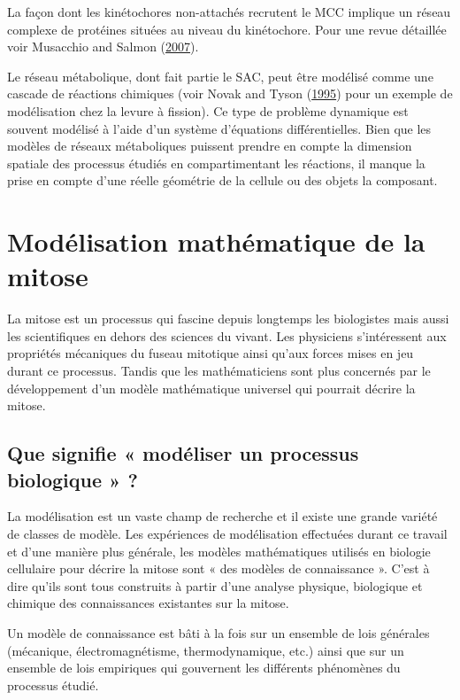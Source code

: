 \documentclass[12pt,a4paper,twoside,openright]{book}
\begin{document}
La façon dont les kinétochores non-attachés recrutent le MCC implique un
réseau complexe de protéines situées au niveau du kinétochore. Pour une
revue détaillée voir Musacchio and Salmon
(\hyperref[ref-Musacchio2007]{2007}).

Le réseau métabolique, dont fait partie le SAC, peut être modélisé comme
une cascade de réactions chimiques (voir Novak and Tyson
(\hyperref[ref-Novak1995]{1995}) pour un exemple de modélisation chez la
levure à fission). Ce type de problème dynamique est souvent modélisé à
l'aide d'un système d'équations différentielles. Bien que les modèles de
réseaux métaboliques puissent prendre en compte la dimension spatiale
des processus étudiés en compartimentant les réactions, il manque la
prise en compte d'une réelle géométrie de la cellule ou des objets la
composant.

\section{Modélisation mathématique de la
mitose}\label{moduxe9lisation-mathuxe9matique-de-la-mitose}

La mitose est un processus qui fascine depuis longtemps les biologistes
mais aussi les scientifiques en dehors des sciences du vivant. Les
physiciens s'intéressent aux propriétés mécaniques du fuseau mitotique
ainsi qu'aux forces mises en jeu durant ce processus. Tandis que les
mathématiciens sont plus concernés par le développement d'un modèle
mathématique universel qui pourrait décrire la mitose.

\subsection{Que signifie « modéliser un processus biologique »
?}\label{que-signifie-moduxe9liser-un-processus-biologique}

La modélisation est un vaste champ de recherche et il existe une grande
variété de classes de modèle. Les expériences de modélisation effectuées
durant ce travail et d'une manière plus générale, les modèles
mathématiques utilisés en biologie cellulaire pour décrire la mitose
sont « des modèles de connaissance ». C'est à dire qu'ils sont tous
construits à partir d'une analyse physique, biologique et chimique des
connaissances existantes sur la mitose.

Un modèle de connaissance est bâti à la fois sur un ensemble de lois
générales (mécanique, électromagnétisme, thermodynamique, etc.) ainsi
que sur un ensemble de lois empiriques qui gouvernent les différents
phénomènes du processus étudié.
\end{document}
